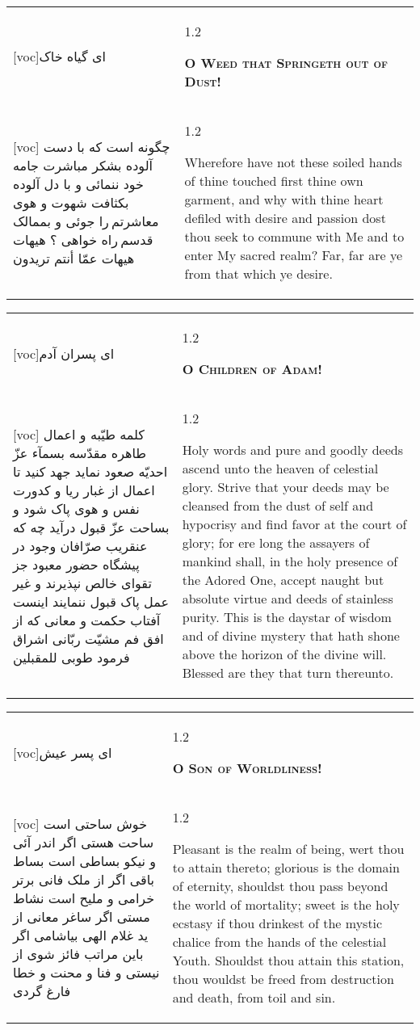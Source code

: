 \documentclass[11pt]{article}
\makeatletter
\newenvironment{orig}
  {\begin{farsi}[voc]}
  {\end{farsi}}
\newenvironment{trans}
  {\Large\begin{spacing}{1.2}\raggedright}
  {\end{spacing}}
\newenvironment{word}
  {\begin{tabular}[t]{p{2.75in}@{\hspace{3em}}p{2.75in}}}
  {\end{tabular}}
\newcommand{\ayat}[2]{\begin{orig}#1\end{orig} & \begin{trans}#2\end{trans}}
\newcommand{\heading}[2]{\textsc{\textbf{#1}} %
}
\makeatother
\begin{document}
\pagebreak

\begin{word}
\ayat{ای گياه خاک}{\heading{O Weed that Springeth out of Dust!}{}} \\ \ayat{
چگونه است که با دست آلوده بشکر مباشرت جامه خود ننمائی و با دل آلوده بکثافت شهوت و هوی معاشرتم را جوئی و بممالک قدسم راه خواهی ؟ هيهات هيهات عمّا أنتم تريدون
}{
  Wherefore have not these soiled hands of thine touched first thine own
  garment, and why with thine heart defiled with desire and passion dost thou
  seek to commune with Me and to enter My sacred realm? Far, far are ye from
  that which ye desire.
}
\end{word}

\pagebreak

\begin{word}
\ayat{ای پسران آدم}{\heading{O Children of Adam!}{}} \\ \ayat{
کلمه طيّبه و اعمال طاهره مقدّسه بسمآء عزّ احديّه صعود نمايد
جهد کنيد تا اعمال از غبار ريا و کدورت نفس و هوی پاک شود و بساحت عزّ قبول درآيد
چه که عنقريب صرّافان وجود در پيشگاه حضور معبود جز تقوای خالص نپذيرند و غير عمل پاک قبول ننمايند
اينست آفتاب حکمت و معانی که از افق فم مشيّت ربّانی اشراق فرمود طوبی للمقبلين
}{
  Holy words and pure and goodly deeds ascend unto the heaven of celestial
  glory. Strive that your deeds may be cleansed from the dust of self and
  hypocrisy and find favor at the court of glory; for ere long the assayers of
  mankind shall, in the holy presence of the Adored One, accept naught but
  absolute virtue and deeds of stainless purity. This is the daystar of wisdom
  and of divine mystery that hath shone above the horizon of the divine will.
  Blessed are they that turn thereunto.
}
\end{word}

\pagebreak

\begin{word}
\ayat{ای پسر عيش}{\heading{O Son of Worldliness!}{}} \\ \ayat{
خوش ساحتی است ساحت هستی اگر اندر آئی و نيکو بساطی است بساط باقی اگر از ملک فانی برتر خرامی و مليح است نشاط مستی اگر ساغر معانی از يد غلام الهی بياشامی اگر باين مراتب فائز شوی از نيستی و فنا و محنت و خطا فارغ گردی
}{
  Pleasant is the realm of being, wert thou to attain thereto; glorious is the
  domain of eternity, shouldst thou pass beyond the world of mortality; sweet
  is the holy ecstasy if thou drinkest of the mystic chalice from the hands of
  the celestial Youth. Shouldst thou attain this station, thou wouldst be
  freed from destruction and death, from toil and sin.
}
\end{word}
\end{document}
